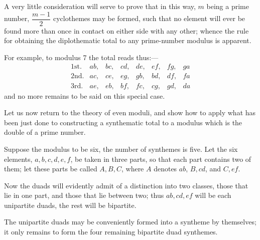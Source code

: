 \documentclass[11pt]{article}
\newcommand{\sourcepage}[1]{\marginpar{\scriptsize p.~#1}}
\begin{document}
\sourcepage{94}
A very little consideration will serve to prove that in this way, $m$ being a prime number, $\dfrac{m-1}{2}$ cyclothemes may be formed, such that no element will ever be found more than once in contact on either side with any other; whence the rule for obtaining the diplothematic total to any prime-number modulus is apparent.

For example, to modulus 7 the total reads thus:---
\[
\begin{array}{rlllllll}
\text{1st.}&ab,&bc,&cd,&de,&ef,&fg,&ga\\
\text{2nd.}&ac,&ce,&eg,&gb,&bd,&df,&fa\\
\text{3rd.}&ae,&eb,&bf,&fc,&cg,&gd,&da
\end{array}
\]
and no more remains to be said on this special case.

Let us now return to the theory of even moduli, and show how to apply what has been just done to constructing a synthematic total to a modulus which is the double of a prime number.

Suppose the modulus to be six, the number of synthemes is five. Let the six elements, $a,b,c,d,e,f$, be taken in three parts, so that each part contains two of them; let these parts be called $A,B,C$, where $A$ denotes $ab$, $B,cd$, and $C,ef$.

Now the duads will evidently admit of a distinction into two classes, those that lie in one part, and those that lie between two; thus $ab,cd,ef$ will be each unipartite duads, the rest will be bipartite.

The unipartite duads may be conveniently formed into a syntheme by themselves; it only remains to form the four remaining bipartite duad synthemes.
\end{document}
